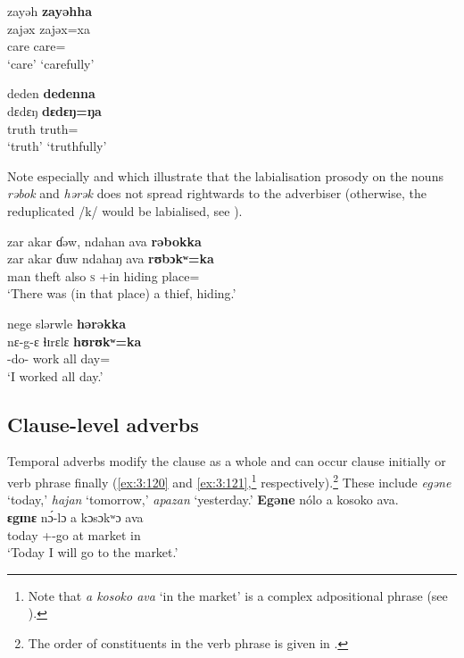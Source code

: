 \ea \label{ex:3:116}
zayəh \hspace{20pt} \textbf{zayəhha}\\
\gll  zajəx \hspace{23pt}   zajəx=xa\\
      care  \hspace{23pt}    {care={\ADV}}\\
\glt  ‘care’  \hspace{21pt}  ‘carefully’
\z

\ea \label{ex:3:117}
deden  \hspace{20pt}  \textbf{dedenna}\\
\gll  dɛdɛŋ   \hspace{22pt} \textbf{dɛdɛŋ=ŋa}\\
      truth  \hspace{22pt}  {truth={\ADV}}\\
\glt  ‘truth’  \hspace{20pt}  ‘truthfully’  
\z

Note especially  and  which illustrate that the labialisation prosody on the nouns \textit{rəbok}  and \textit{hərək}  does not spread rightwards to the adverbiser (otherwise, the reduplicated /k/ would be labialised, see ). 

\ea \label{ex:3:118}
zar  akar  ɗəw,  ndahan  ava  \textbf{rəbokka}\\
\gll  zar     akar  ɗuw  ndahaŋ  ava  \textbf{rʊbɔkʷ}\textbf{=ka}\\
      man    theft  also  \textsc{s}  {\EXT}{}+in  {hiding place}={\ADV}\\
\glt  ‘There was (in that place) a thief, hiding.’ 
\z

\ea \label{ex:3:119}
nege  slərwle  \textbf{hərəkka}\\
\gll  nɛ-g-ɛ  ɬɪrɛlɛ  \textbf{hʊrʊkʷ}\textbf{=ka}\\
      {\oneS}-do-{\CL}  work  {all day}={\ADV}\\
\glt  ‘I worked all day.’
\z

\subsection{Clause-level adverbs}\label{sec:3.5.3}
\hypertarget{RefHeading1211201525720847}{}
Temporal adverbs modify the clause as a whole and can occur clause initially or verb phrase finally (\ref{ex:3:120} and \ref{ex:3:121},\footnote{Note that \textit{a kosoko ava} ‘in the market’ is a complex adpositional phrase (see ).} respectively).\footnote{The order of constituents in the verb phrase is given in .} These include \textit{egəne} ‘today,’ \textit{hajan} ‘tomorrow,’ \textit{apazan} ‘yesterday.’ 
\clearpage
\ea \label{ex:3:120}
\textbf{Egəne} nólo  a  kosoko  ava.\\
\gll  \textbf{ɛgɪnɛ}  n\'{ɔ}-lɔ     a  kɔsɔkʷɔ  ava\\
      today  {\oneS}+{\IFV}-go  at  market  in\\
\glt  ‘Today I will go to the market.’
\z

